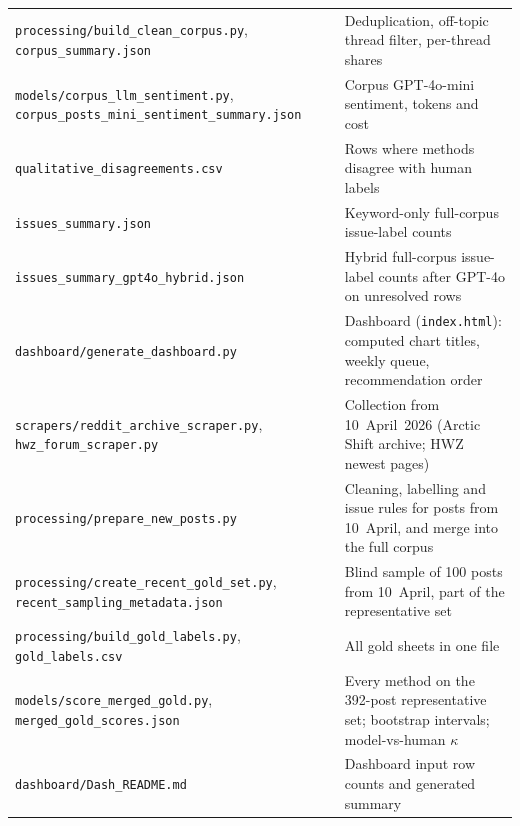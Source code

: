 \documentclass[11pt,a4paper]{article}
\begin{document}
\begin{longtable}{@{}p{}p{}@{}}
\texttt{processing/\allowbreak{}build\_\allowbreak{}clean\_\allowbreak{}corpus.py}, \texttt{corpus\_\allowbreak{}summary.json} & Deduplication, off-topic thread filter, per-thread shares \\
\texttt{models/\allowbreak{}corpus\_\allowbreak{}llm\_\allowbreak{}sentiment.py}, \texttt{corpus\_\allowbreak{}posts\_\allowbreak{}mini\_\allowbreak{}sentiment\_\allowbreak{}summary.json} & Corpus GPT-4o-mini sentiment, tokens and cost \\
\texttt{qualitative\_\allowbreak{}disagreements.csv} & Rows where methods disagree with human labels \\
\texttt{issues\_\allowbreak{}summary.json} & Keyword-only full-corpus issue-label counts \\
\texttt{issues\_\allowbreak{}summary\_\allowbreak{}gpt4o\_\allowbreak{}hybrid.json} & Hybrid full-corpus issue-label counts after GPT-4o on unresolved rows \\
\texttt{dashboard/\allowbreak{}generate\_\allowbreak{}dashboard.py} & Dashboard (\texttt{index.html}): computed chart titles, weekly queue, recommendation order \\
\texttt{scrapers/\allowbreak{}reddit\_\allowbreak{}archive\_\allowbreak{}scraper.py}, \texttt{hwz\_\allowbreak{}forum\_\allowbreak{}scraper.py} & Collection from 10~April~2026 (Arctic Shift archive; HWZ newest pages) \\
\texttt{processing/\allowbreak{}prepare\_\allowbreak{}new\_\allowbreak{}posts.py} & Cleaning, labelling and issue rules for posts from 10~April, and merge into the full corpus \\
\texttt{processing/\allowbreak{}create\_\allowbreak{}recent\_\allowbreak{}gold\_\allowbreak{}set.py}, \texttt{recent\_\allowbreak{}sampling\_\allowbreak{}metadata.json} & Blind sample of 100 posts from 10~April, part of the representative set \\
\texttt{processing/\allowbreak{}build\_\allowbreak{}gold\_\allowbreak{}labels.py}, \texttt{gold\_\allowbreak{}labels.csv} & All gold sheets in one file \\
\texttt{models/\allowbreak{}score\_\allowbreak{}merged\_\allowbreak{}gold.py}, \texttt{merged\_\allowbreak{}gold\_\allowbreak{}scores.json} & Every method on the 392-post representative set; bootstrap intervals; model-vs-human $\kappa$ \\
\texttt{dashboard/\allowbreak{}Dash\_\allowbreak{}README.md} & Dashboard input row counts and generated summary \\
\bottomrule
\end{longtable}
\end{document}
